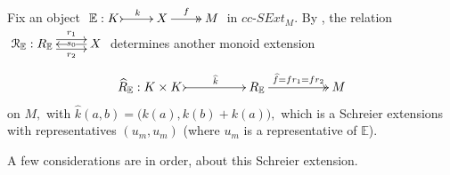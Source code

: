 \documentclass[a4paper]{amsart}
\theoremstyle{plain}
\theoremstyle{definition}
\theoremstyle{remark}
\begin{document}
Fix an object $\xymatrix{{\mathbb{E}:K} \ar@{>->}[r]^-{k} &{X} \ar@{->>}[r]^-{f} &M}$ in $cc\text{-}SExt_M.$ By \cite[Proposition 5.6]{AMR}, the relation $\xymatrix{ {\mathcal{R}_{\mathbb{E}}:R_{\mathbb{E}}}\ar@<.9ex>[r]^-{r_1} \ar@<-.9ex>[r]_-{r_2} &{X} \ar[l]|-{s_0}}$ determines another monoid extension
\begin{equation}
\label{eqn:R-hat}
\xymatrixcolsep{4pc}
\xymatrix{{\widehat{R}_{\mathbb{E}}:K\times K} \ar@{>->}[r]^-{\widehat{k}} &{R_{\mathbb{E}}} \ar@{->>}[r]^-{\widehat{f}=fr_1=fr_2} &M}
\end{equation}
on $M,$ with $\widehat{k}(a,b)=\big(k(a),k(b)+k(a)\big),$ which is a Schreier extensions with representatives $(u_m,u_m)$ (where $u_m$ is a representative of $\mathbb{E}$).

A few considerations are in order, about this Schreier extension.
\end{document}
